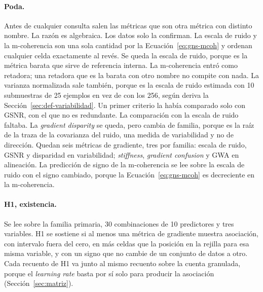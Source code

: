 \paragraph{Poda.} Antes de cualquier consulta salen las métricas que son otra métrica con distinto nombre. La razón es algebraica. Los datos solo la confirman. La escala de ruido y la m-coherencia son una sola cantidad por la Ecuación~\ref{eq:gns-mcoh} y ordenan cualquier celda exactamente al revés. Se queda la escala de ruido, porque es la métrica barata que sirve de referencia interna. La m-coherencia entró como retadora; una retadora que es la barata con otro nombre no compite con nada. La varianza normalizada sale también, porque es la escala de ruido estimada con 10 submuestras de 25 ejemplos en vez de con los 256, según deriva la Sección~\ref{sec:def-variabilidad}. Un primer criterio la había comparado solo con GSNR, con el que no es redundante. La comparación con la escala de ruido faltaba. La \emph{gradient disparity} se queda, pero cambia de familia, porque es la raíz de la traza de la covarianza del ruido, una medida de variabilidad y no de dirección. Quedan seis métricas de gradiente, tres por familia: escala de ruido, GSNR y disparidad en variabilidad; \emph{stiffness}, \emph{gradient confusion} y GWA en alineación. La predicción de signo de la m-coherencia se lee sobre la escala de ruido con el signo cambiado, porque la Ecuación~\ref{eq:gns-mcoh} es decreciente en la m-coherencia.

\paragraph{H1, existencia.} Se lee sobre la familia primaria, 30 combinaciones de 10 predictores y tres variables. H1 se sostiene si al menos una métrica de gradiente muestra asociación, con intervalo fuera del cero, en más celdas que la posición en la rejilla para esa misma variable, y con un signo que no cambie de un conjunto de datos a otro. Cada recuento de H1 va junto al mismo recuento sobre la cuenta granulada, porque el \emph{learning rate} basta por sí solo para producir la asociación (Sección~\ref{sec:matriz}).

